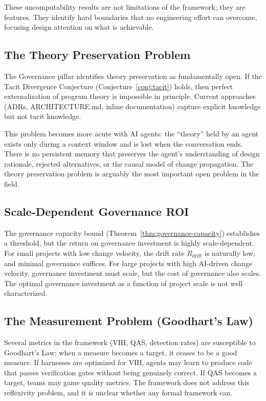 \documentclass[11pt, a4paper, logo, copyright]{googledeepmind}
\begin{document}
These uncomputability results are not limitations of the framework; they are features. They identify hard boundaries that no engineering effort can overcome, focusing design attention on what is achievable.

\subsection{The Theory Preservation Problem}

The Governance pillar identifies theory preservation as fundamentally open. If the Tacit Divergence Conjecture (Conjecture~\ref{conj:tacit}) holds, then perfect externalization of program theory is impossible in principle. Current approaches (ADRs, ARCHITECTURE.md, inline documentation) capture explicit knowledge but not tacit knowledge.

This problem becomes more acute with AI agents: the ``theory'' held by an agent exists only during a context window and is lost when the conversation ends. There is no persistent memory that preserves the agent's understanding of design rationale, rejected alternatives, or the causal model of change propagation. The theory preservation problem is arguably the most important open problem in the field.

\subsection{Scale-Dependent Governance ROI}

The governance capacity bound (Theorem~\ref{thm:governance-capacity}) establishes a threshold, but the return on governance investment is highly scale-dependent. For small projects with low change velocity, the drift rate $R_{\text{drift}}$ is naturally low, and minimal governance suffices. For large projects with high AI-driven change velocity, governance investment must scale, but the cost of governance also scales. The optimal governance investment as a function of project scale is not well characterized.

\subsection{The Measurement Problem (Goodhart's Law)}

Several metrics in the framework (VIH, QAS, detection rates) are susceptible to Goodhart's Law: when a measure becomes a target, it ceases to be a good measure. If harnesses are optimized for VIH, agents may learn to produce code that passes verification gates without being genuinely correct. If QAS becomes a target, teams may game quality metrics. The framework does not address this reflexivity problem, and it is unclear whether any formal framework can.
\end{document}

